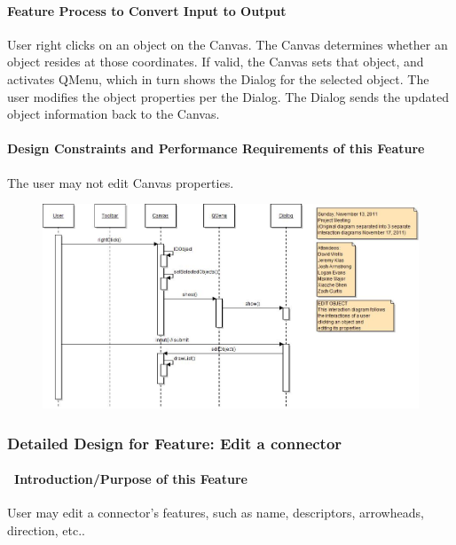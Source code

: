 \documentclass[twoside,letterpaper]{article}
\begin{document}
{\paragraph{Feature Process to Convert Input to Output}
{\color{black}
User right clicks on an object on the Canvas. The Canvas determines whether an object resides at those coordinates. If valid, the Canvas sets that object, and activates QMenu, which in turn shows the Dialog for the selected object.
The user modifies the object properties per the Dialog.  The Dialog sends the updated object information back to the Canvas.
}

\paragraph{Design Constraints and Performance Requirements of this Feature}
{\color{black}
The user may not edit Canvas properties.
}
\bigskip
\bigskip

\begin{figure}[h]
\centering
\includegraphics[width=6.0in]{IntEditObj.jpg}
\end{figure}

\clearpage


\subsubsection{Detailed Design for Feature: Edit a connector}

\paragraph[\ Introduction/Purpose of this Feature]
{\ Introduction/Purpose of this Feature}
{\color{black}
User may edit a connector{\textquoteright}s features, such as name, descriptors, arrowheads, direction, etc..
}

}
\end{document}
